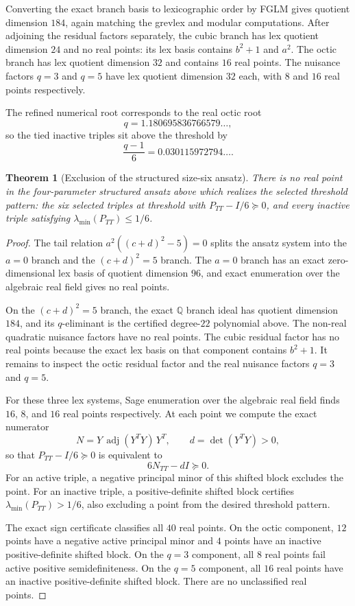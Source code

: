 \documentclass[11pt]{article}
\numberwithin{equation}{section}
\newtheorem{theorem}{Theorem}[section]
\theoremstyle{definition}
\begin{document}
Converting the exact branch basis to lexicographic order by FGLM gives quotient
dimension \(184\), again matching the grevlex and modular computations.  After
adjoining the residual factors separately, the cubic branch has lex quotient
dimension \(24\) and no real points: its lex basis contains \(b^2+1\) and
\(a^2\).  The octic branch has lex quotient dimension \(32\) and contains
\(16\) real points.  The nuisance factors \(q=3\) and \(q=5\) have lex quotient
dimension \(32\) each, with \(8\) and \(16\) real points respectively.

The refined numerical root corresponds to the real octic root
\[
  q=1.180695836766579\ldots,
\]
so the tied inactive triples sit above the threshold by
\[
  \frac{q-1}{6}=0.030115972794\ldots.
\]

\begin{theorem}[Exclusion of the structured size-six ansatz]
There is no real point in the four-parameter structured ansatz above which
realizes the selected threshold pattern: the six selected triples at threshold
with \(P_{TT}-I/6\succeq0\), and every inactive triple satisfying
\(\lambda_{\min}(P_{TT})\le 1/6\).
\end{theorem}

\begin{proof}
The tail relation \(a^2((c+d)^2-5)=0\) splits the ansatz system into the
\(a=0\) branch and the \((c+d)^2=5\) branch.  The \(a=0\) branch has an exact
zero-dimensional lex basis of quotient dimension \(96\), and exact enumeration
over the algebraic real field gives no real points.

On the \((c+d)^2=5\) branch, the exact \(\mathbb Q\) branch ideal has quotient
dimension \(184\), and its \(q\)-eliminant is the certified degree-\(22\)
polynomial above.  The non-real quadratic nuisance factors have no real points.
The cubic residual factor has no real points because the exact lex basis on
that component contains \(b^2+1\).  It remains to inspect the octic residual
factor and the real nuisance factors \(q=3\) and \(q=5\).

For these three lex systems, Sage enumeration over the algebraic real field
finds \(16\), \(8\), and \(16\) real points respectively.  At each point we
compute the exact numerator
\[
  N=Y\,\operatorname{adj}(Y^TY)\,Y^T,\qquad d=\det(Y^TY)>0,
\]
so that \(P_{TT}-I/6\succeq0\) is equivalent to
\[
  6N_{TT}-dI\succeq0 .
\]
For an active triple, a negative principal minor of this shifted block excludes
the point.  For an inactive triple, a positive-definite shifted block certifies
\(\lambda_{\min}(P_{TT})>1/6\), also excluding a point from the desired
threshold pattern.

The exact sign certificate classifies all \(40\) real points.  On the octic
component, \(12\) points have a negative active principal minor and \(4\) points
have an inactive positive-definite shifted block.  On the \(q=3\) component,
all \(8\) real points fail active positive semidefiniteness.  On the \(q=5\)
component, all \(16\) real points have an inactive positive-definite shifted
block.  There are no unclassified real points.
\end{proof}
\end{document}
